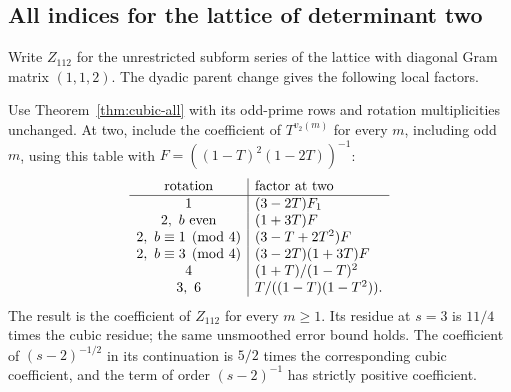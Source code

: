 \subsection*{All indices for the lattice of determinant two}
Write $Z_{112}$ for the unrestricted subform series of the lattice
with diagonal Gram matrix $(1,1,2)$. The dyadic parent change gives the following local factors.

\begin{theorem}\label{thm:det-two}
Use Theorem~\ref{thm:cubic-all} with its odd-prime rows and rotation
multiplicities unchanged. At two, include the coefficient of
$T^{v_2(m)}$ for every $m$, including odd $m$, using this table with
$F=((1-T)^2(1-2T))^{-1}$:
\[
\begin{array}{c|l}
\text{rotation}&\text{factor at two}\\ \hline
1 &(3-2T)F_1\\
2,\ b\ {\rm even}&(1+3T)F\\
2,\ b\equiv1\pmod4 &(3-T+2T^2)F\\
2,\ b\equiv3\pmod4 &(3-2T)(1+3T)F\\
4 &(1+T)/(1-T)^2\\
3,\ 6 &T/((1-T)(1-T^2)).
\end{array}
\]
The result is the coefficient of $Z_{112}$ for every $m\ge1$.
Its residue at $s=3$ is $11/4$ times the cubic residue; the same
unsmoothed error bound holds. The coefficient of $(s-2)^{-1/2}$ in
its continuation is $5/2$ times the corresponding cubic coefficient,
and the term of order $(s-2)^{-1}$ has strictly positive coefficient.
\end{theorem}
